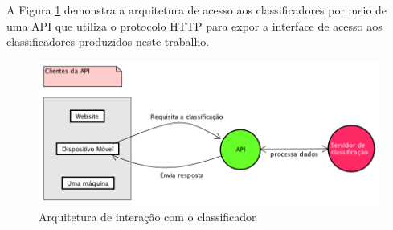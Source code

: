 A Figura \ref{fig:api} demonstra a arquitetura de acesso aos classificadores por meio de uma API que utiliza o protocolo HTTP para expor a interface de acesso aos classificadores produzidos neste trabalho.

\begin{figure}[htb]
  \caption{\label{fig:api}Arquitetura de interação com o classificador}
  \begin{center}
    \includegraphics[scale=0.7]{imagens/api-diagram.png}
  \end{center}
\end{figure}
\newpage
